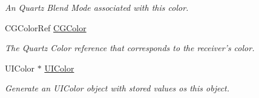 \begin{DoxyCompactItemize}
\begin{DoxyCompactList}\small\item\em An Quartz Blend Mode associated with this color. \item\end{DoxyCompactList}\item 
CGColorRef \hyperlink{interface_j_p_color_a6b74a8281b3ebf94eeda2db00ab048fb}{CGColor}
\begin{DoxyCompactList}\small\item\em The Quartz Color reference that corresponds to the receiver’s color. \item\end{DoxyCompactList}\item 
\hypertarget{interface_j_p_color_aa2114c2e3a1064060f461a30c04e9368}{
UIColor $\ast$ \hyperlink{interface_j_p_color_aa2114c2e3a1064060f461a30c04e9368}{UIColor}}
\label{interface_j_p_color_aa2114c2e3a1064060f461a30c04e9368}

\begin{DoxyCompactList}\small\item\em Generate an UIColor object with stored values os this object. \item\end{DoxyCompactList}\end{DoxyCompactItemize}
